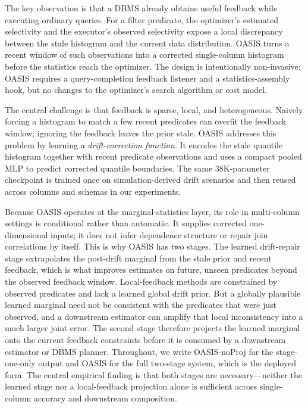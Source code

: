 \documentclass[preprint,12pt]{elsarticle}
\begin{document}
The key observation is that a DBMS already obtains useful feedback while
executing ordinary queries. For a filter predicate, the optimizer's estimated
selectivity and the executor's observed selectivity expose a local discrepancy
between the stale histogram and the current data distribution. OASIS turns a
recent window of such observations into a corrected single-column histogram
before the statistics reach the optimizer. The design is intentionally
non-invasive: OASIS requires a query-completion feedback listener and a
statistics-assembly hook, but no changes to the optimizer's search algorithm or
cost model.

The central challenge is that feedback is sparse, local, and heterogeneous.
Naively forcing a histogram to match a few recent predicates can overfit the
feedback window; ignoring the feedback leaves the prior stale. OASIS addresses
this problem by learning a \emph{drift-correction function}. It encodes the
stale quantile histogram together with recent predicate observations and uses a
compact pooled MLP to predict corrected quantile boundaries. The same
38K-parameter checkpoint is trained once on simulation-derived drift scenarios
and then reused across columns and schemas in our experiments.

Because OASIS operates at the marginal-statistics layer, its role in
multi-column settings is conditional rather than automatic. It supplies
corrected one-dimensional inputs; it does not infer dependence structure or
repair join correlations by itself. This is why OASIS has two stages. The
learned drift-repair stage extrapolates the post-drift marginal from the stale
prior and recent feedback, which is what improves estimates on future, unseen
predicates beyond the observed feedback window. Local-feedback methods are
constrained by observed predicates and lack a learned global drift prior. But a
globally plausible learned marginal need not be consistent with the predicates
that were just observed, and a downstream estimator can amplify that local
inconsistency into a much larger joint error. The second stage therefore
projects the learned marginal onto the current feedback constraints before it is
consumed by a downstream estimator or DBMS planner. Throughout, we write
OASIS-noProj for the stage-one-only output
and OASIS for the full two-stage system, which is the deployed form. The central
empirical finding is that both
stages are necessary---neither the learned stage nor a local-feedback projection
alone is sufficient across single-column accuracy and downstream composition.
\end{document}
